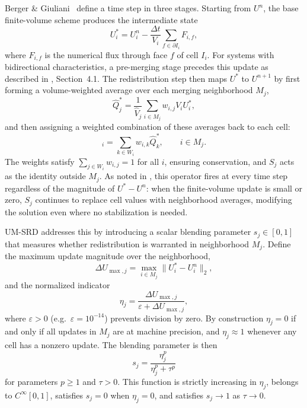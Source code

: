 \documentclass[11pt]{article}
\begin{document}
Berger \& Giuliani~\cite{berger2024} define a time step in three stages. 
Starting from $U^n$, the base finite-volume scheme produces the intermediate 
state
\begin{equation}
  U^*_i = U^n_i - \frac{\Delta t}{V_i} \sum_{f \in \partial I_i} F_{i,f},
  \label{eq:fv-update}
\end{equation}
where $F_{i,f}$ is the numerical flux through face $f$ of cell $I_i$. For 
systems with bidirectional characteristics, a pre-merging stage precedes 
this update as described in \cite{berger2024}, Section~4.1. The 
redistribution step then maps $U^*$ to $U^{n+1}$ by first forming a 
volume-weighted average over each merging neighborhood $M_j$,
\begin{equation}
  \hat{Q}^*_j = \frac{1}{\hat{V}_j} \sum_{i \in M_j} w_{i,j} V_i U^*_i,
  \label{eq:Qhat}
\end{equation}
and then assigning a weighted combination of these averages back to each 
cell:
\begin{equation}
  [S_j U^*]_i = \sum_{k \in W_i} w_{i,k} \hat{Q}^*_k,
  \qquad i \in M_j.
  \label{eq:SRD-op}
\end{equation}
The weights satisfy $\sum_{j \in W_i} w_{i,j} = 1$ for all $i$, ensuring 
conservation, and $S_j$ acts as the identity outside $M_j$. As noted in 
\cite{berger2024}, this operator fires at every time step regardless of 
the magnitude of $U^* - U^n$: when the finite-volume update is small or 
zero, $S_j$ continues to replace cell values with neighborhood averages, 
modifying the solution even where no stabilization is needed.

UM-SRD addresses this by introducing a scalar blending parameter $s_j \in 
[0,1]$ that measures whether redistribution is warranted in neighborhood 
$M_j$. Define the maximum update magnitude over the neighborhood,
\begin{equation}
  \Delta U_{\max,j} = \max_{i \in M_j} \|U^*_i - U^n_i\|_2,
  \label{eq:DUmax}
\end{equation}
and the normalized indicator
\begin{equation}
  \eta_j = \frac{\Delta U_{\max,j}}{\varepsilon + \Delta U_{\max,j}},
  \label{eq:eta}
\end{equation}
where $\varepsilon > 0$ (e.g.\ $\varepsilon = 10^{-14}$) prevents division 
by zero. By construction $\eta_j = 0$ if and only if all 
updates in $M_j$ are at machine precision, and $\eta_j \approx 1$ whenever 
any cell has a nonzero update. The blending parameter is then
\begin{equation}
  s_j = \frac{\eta_j^p}{\eta_j^p + \tau^p}
  \label{eq:shutoff}
\end{equation}
for parameters $p \ge 1$ and $\tau > 0$. This function is strictly 
increasing in $\eta_j$, belongs to $C^\infty[0,1]$, satisfies $s_j = 0$ 
when $\eta_j = 0$, and satisfies $s_j \to 1$ as $\tau \to 0$.
\end{document}
